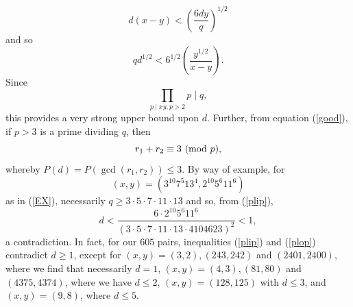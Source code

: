 \documentclass{amsart}
\def\mod#1{{\ifmmode\text{\rm\ (mod~$#1$)}
\else\discretionary{}{}{\hbox{ }}\rm(mod~$#1$)\fi}}
\begin{document}
$$
d (x-y) < \left( \frac{6dy}{q} \right)^{1/2}
$$
and so
\begin{equation} \label{plip}
q d^{1/2} < 6^{1/2} \left( \frac{y^{1/2}}{x-y} \right).
\end{equation}
 Since
 \begin{equation} \label{plop}
  \prod_{p \mid xy, p > 2} p \mid q,
 \end{equation}
 this provides a very strong upper bound upon $d$. Further, from equation (\ref{good}), if $p > 3$ is a prime dividing $q$, then
 $$
 r_1+r_2 \equiv 3 \mod{p},
 $$
 whereby $P(d) = P(\gcd(r_1,r_2)) \leq 3$. By way of example, for 
 $$
 (x,y) = \left( 3^{10} 7^5 13^4, 2^{10} 5^6 11^6 \right)
 $$
 as in (\ref{EX}), necessarily $q \geq 3 \cdot 5 \cdot 7 \cdot 11 \cdot 13$ and so, from (\ref{plip}), 
 $$
 d < \frac{6 \cdot 2^{10} 5^6 11^6}{\left( 3 \cdot 5 \cdot 7 \cdot 11 \cdot 13 \cdot 4104623 \right)^2} < 1,
 $$
 a contradiction. In fact, for  our $605$ pairs, inequalities (\ref{plip}) and (\ref{plop}) contradict $d \geq 1$, except for $(x,y)=(3,2), (243,242)$ and $(2401,2400)$, where we find that necessarily $d=1$,  
$(x,y)=(4,3), (81,80)$ and $(4375,4374)$, where we have $d \leq 2$, $(x,y)=(128,125)$ with $d \leq 3$, and
$(x,y)=(9,8)$, where  $d \leq 5$. 
\end{document}
